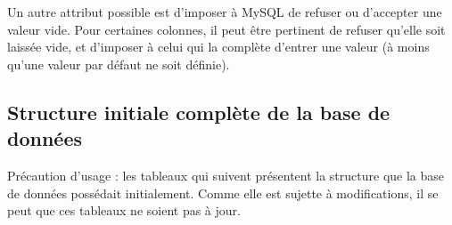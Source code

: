 \documentclass[12pt,a4paper]{article}
\begin{document}
        Un autre attribut possible est d'imposer à MySQL de refuser ou
        d'accepter une valeur vide. Pour certaines colonnes, il peut être
        pertinent de refuser qu'elle soit laissée vide, et d'imposer à celui
        qui la complète d'entrer une valeur (à moins qu'une valeur par défaut
        ne soit définie).


    \subsection{Structure initiale complète de la base de données}\label{structureinitiale}
    Précaution d'usage : les tableaux qui suivent présentent la structure que la base
    de données possédait initialement. Comme elle est sujette à modifications, il se
    peut que ces tableaux ne soient pas à jour.
    
\end{document}
